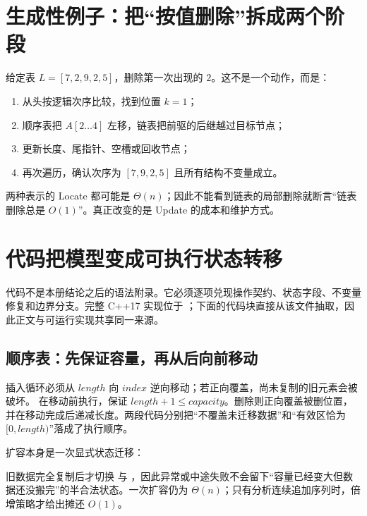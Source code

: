 \documentclass[UTF8,fontset=none,11pt,a4paper]{ctexart}
\begin{document}
\section{生成性例子：把“按值删除”拆成两个阶段}
给定表 $L=[7,2,9,2,5]$，删除第一次出现的 $2$。这不是一个动作，而是：
\begin{enumerate}
\item {}从头按逻辑次序比较，找到位置 $k=1$；
\item {}顺序表把 $A[2\ldots4]$ 左移，链表把前驱的后继越过目标节点；
\item {}更新长度、尾指针、空槽或回收节点；
\item {}再次遍历，确认次序为 $[7,9,2,5]$ 且所有结构不变量成立。
\end{enumerate}
两种表示的 Locate 都可能是 $\Theta(n)$；因此不能看到链表的局部删除就断言“链表删除总是 $O(1)$”。真正改变的是 Update 的成本和维护方式。

\section{代码把模型变成可执行状态转移}
代码不是本册结论之后的语法附录。它必须逐项兑现操作契约、状态字段、不变量修复和边界分支。完整 C++17 实现位于 ；下面的代码块直接从该文件抽取，因此正文与可运行实现共享同一来源。

\subsection{顺序表：先保证容量，再从后向前移动}


插入循环必须从 $length$ 向 $index$ 逆向移动；若正向覆盖，尚未复制的旧元素会被破坏。 在移动前执行，保证 $length+1\le capacity$。删除则正向覆盖被删位置，并在移动完成后递减长度。两段代码分别把“不覆盖未迁移数据”和“有效区恰为 $[0,length)$”落成了执行顺序。

扩容本身是一次显式状态迁移：


旧数据完全复制后才切换  与 ，因此异常或中途失败不会留下“容量已经变大但数据还没搬完”的半合法状态。一次扩容仍为 $\Theta(n)$；只有分析连续追加序列时，倍增策略才给出摊还 $O(1)$。
\end{document}
